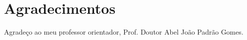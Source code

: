 \chapter*{Agradecimentos}
\label{ch::ack}

\todo{}

Agradeço ao meu professor orientador, Prof. Doutor Abel João Padrão Gomes.
